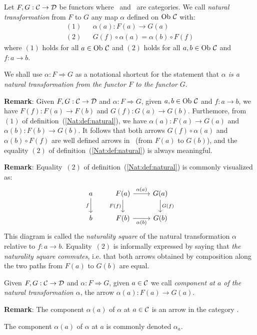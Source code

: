 \begin{defin}\label{Nat:def:natural}
    Let $F,G:\mbox{$\cal C$}\to\mbox{$\cal D$}$ be functors where \Cat\ and \Dat\ are categories.
    We call {\em natural transformation} from $F$ to $G$ any map $\alpha$
    defined on $\mbox{\rm Ob}\ \mbox{$\cal C$}$ with:
        \begin{eqnarray*}
            (1)& &\alpha(a) : F(a) \to G(a)\\
            (2)& &G(f)\circ\alpha(a) = \alpha(b) \circ F(f)
        \end{eqnarray*}
    where $(1)$ holds for all $a\in\mbox{\rm Ob}\ \mbox{$\cal C$}$ and $(2)$ holds for all 
    $a,b\in\mbox{\rm Ob}\ \mbox{$\cal C$}$ and $f:a\to b$.
\end{defin}

\begin{notation}\label{Nat:notation:natural:arrow}
    We shall use $\alpha:F\Rightarrow G$ as a notational shortcut for the
    statement that {\em $\alpha$ is a natural transformation from the
    functor $F$ to the functor $G$}.
\end{notation}

\noindent
{\bf Remark}: Given $F,G:\mbox{$\cal C$}\to\mbox{$\cal D$}$ and $\alpha:F\Rightarrow G$, given
$a,b\in\mbox{\rm Ob}\ \mbox{$\cal C$}$ and $f:a \to b$, we have $F(f):F(a) \to F(b)$ and 
$G(f):G(a)\to G(b)$. Furthemore, from $(1)$ of definition~(\ref{Nat:def:natural}), 
we have $\alpha(a):F(a)\to G(a)$ and $\alpha(b):F(b)\to G(b)$. It follows 
that both arrows $G(f)\circ\alpha(a)$ and $\alpha(b)\circ F(f)$ are well 
defined arrows in \Dat\ (from $F(a)$ to $G(b)$), and the equality $(2)$ of 
definition~(\ref{Nat:def:natural}) is always meaningful.

\noindent
{\bf Remark}: Equality~$(2)$ of definition~(\ref{Nat:def:natural}) is commonly
visualized as: 
    \[
        \begin{tikzcd}
            a\arrow[d,swap, "f"]
            &F(a)\arrow[r, "\alpha(a)"]\arrow[d, swap,"F(f)"]
            &G(a)\arrow[d, "G(f)"]
            \\
            b
            &F(b)\arrow[r, swap, "\alpha(b)"]
            &G(b)
        \end{tikzcd}
    \]
This diagram is called the {\em naturality square} of the
natural transformation $\alpha$ relative to $f:a \to b$. Equality~$(2)$
is informally expressed by saying that {\em the naturality square commutes},
i.e. that both arrows obtained by composition along the two paths from $F(a)$ 
to $G(b)$ are equal. 

\begin{defin}\label{Nat:def:natural:component}
    Given $F,G:\mbox{$\cal C$}\to\mbox{$\cal D$}$ and $\alpha:F\Rightarrow G$, given $a\in\mbox{$\cal C$}$
    we call {\em component at $a$ of the natural transformation $\alpha$},
    the arrow $\alpha(a):F(a)\to G(a)$.
\end{defin}

\noindent
{\bf Remark}: The component $\alpha(a)$ of $\alpha$ at $a\in\mbox{$\cal C$}$ is an arrow 
in the category \Dat.

\begin{notation}\label{Nat:notation:natural:component}
    The component $\alpha(a)$ of $\alpha$ at $a$ is commonly denoted $\alpha_{a}$.
\end{notation}


